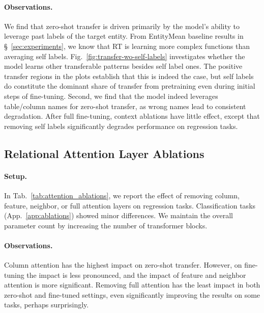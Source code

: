 \paragraph{Observations.}
We find that zero-shot transfer is driven primarily by the model’s ability to leverage past labels of the target entity.
From EntityMean baseline results in \S~\ref{sec:experiments},
we know that RT is learning more complex functions than averaging
self labels.
Fig.~\ref{fig:transfer-wo-self-labels} investigates whether the model learns other transferable patterns besides self label ones.
The positive transfer regions in the plots establish that this is indeed the case,
but self labels do constitute the dominant share of transfer from pretraining
even during initial steps of fine-tuning.
Second, we find that the model indeed leverages table/column names
for zero-shot transfer, as wrong names lead to consistent degradation.
After full fine-tuning, context ablations have little effect,
except that removing self labels significantly degrades performance on regression tasks.










\subsection{Relational Attention Layer Ablations}
\label{sec:layer_ablation}

\paragraph{Setup.} 
In Tab.~\ref{tab:attention_ablations}, we report the effect of removing column, feature, neighbor, or full attention layers on regression tasks. Classification tasks (App.~\ref{app:ablations}) showed minor differences.
We maintain the overall parameter count by increasing the number of transformer blocks.

\paragraph{Observations.}
Column attention has the highest impact on zero-shot transfer. 
However, on fine-tuning the impact is less pronounced, and the impact of feature and neighbor attention is more significant.
Removing full attention has the least impact in both zero-shot and fine-tuned settings, even significantly improving the results on some tasks, perhaps surprisingly.

